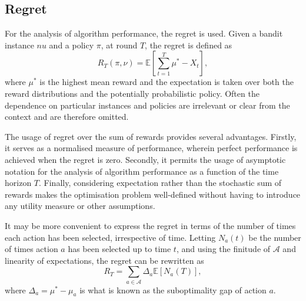 \subsection{Regret}
For the analysis of algorithm performance, the regret is used.
Given a bandit instance $nu$ and a policy $\pi$, at round $T$, the regret is defined as
\begin{equation}
    R_T(\pi, \nu) = \mathbb{E}\left[\sum_{t=1}^T \mu^* - X_t\right],
    \label{eq:regret1}
\end{equation}
where $\mu^*$ is the highest mean reward and the expectation is taken over both the reward distributions and the potentially probabilistic policy.
Often the dependence on particular instances and policies are irrelevant or clear from the context and are therefore omitted.

The usage of regret over the sum of rewards provides several advantages.
Firstly, it serves as a normalised measure of performance, wherein perfect performance is achieved when the regret is zero.
Secondly, it permits the usage of asymptotic notation for the analysis of algorithm performance as a function of the time horizon $T$.
Finally, considering expectation rather than the stochastic sum of rewards makes the optimisation problem well-defined without having to introduce any utility measure or other assumptions.

It may be more convenient to express the regret in terms of the number of times each action has been selected, irrespective of time.
Letting $N_a(t)$ be the number of times action $a$ has been selected up to time $t$, and using the finitude of $\mathcal{A}$ and linearity of expectations, the regret can be rewritten as
\begin{equation}
    R_T = \sum_{a \in \mathcal{A}} \Delta_a  \mathbb{E}[N_a(T)],
    \label{eq:regret2}
\end{equation}
where $\Delta_a = \mu^* - \mu_a$ is what is known as the suboptimality gap of action $a$.
